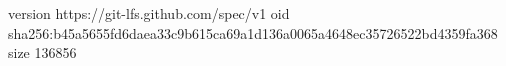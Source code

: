 version https://git-lfs.github.com/spec/v1
oid sha256:b45a5655fd6daea33c9b615ca69a1d136a0065a4648ec35726522bd4359fa368
size 136856
